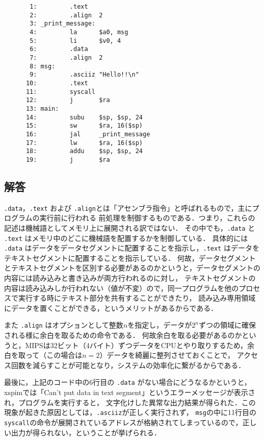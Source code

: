 \documentclass[a4j,11pt]{jarticle}
\begin{document}
\begin{verbatim}
       1:         .text
       2:         .align  2
       3: _print_message:
       4:         la      $a0, msg
       5:         li      $v0, 4
       6:         .data
       7:         .align  2
       8: msg:
       9:         .asciiz "Hello!!\n"
      10:         .text
      11:         syscall
      12:         j       $ra
      13: main:
      14:         subu    $sp, $sp, 24
      15:         sw      $ra, 16($sp)
      16:         jal     _print_message
      17:         lw      $ra, 16($sp)
      18:         addu    $sp, $sp, 24
      19:         j       $ra
\end{verbatim}

\subsection{解答}

{\tt.data}，{\tt.text} および {\tt.align}とは「アセンブラ指令」と呼ばれるもので，主にプログラムの実行前に行われる
前処理を制御するものである．つまり，これらの記述は機械語としてメモリ上に展開される訳ではない．
その中でも，{\tt.data} と {\tt.text} はメモリ中のどこに機械語を配置するかを制御している．
具体的には {\tt.data} はデータをデータセグメントに配置することを指示し，{\tt.text} はデータをテキストセグメントに配置することを指示している．
何故，データセグメントとテキストセグメントを区別する必要があるのかというと，データセグメントの内容には読み込みと書き込みが両方行われるのに対し，
テキストセグメントの内容は読み込みしか行われない（値が不変）ので，同一プログラムを他のプロセスで実行する時にテキスト部分を共有することができたり，
読み込み専用領域にデータを置くことができる，というメリットがあるからである．

また {\tt.align} はオプションとして整数$n$を指定し，データが$2^{n}$ずつの領域に確保される様に余白を取るための命令である．
何故余白を取る必要があるのかというと，MIPSは32ビット（4バイト）ずつデータをCPUとやり取りするため，余白を取って（この場合は$n = 2$）データを綺麗に整列させておくことで，
アクセス回数を減らすことが可能となり，システムの効率化に繋がるからである．

最後に，上記のコード中の6行目の {\tt.data} がない場合にどうなるかというと，xspimでは「Can't put data in text segment」というエラーメッセージが表示され，プログラムを実行すると，
文字化けした異常な出力結果が得られた．この現象が起きた原因としては，{{\tt .asciiz}}が正しく実行されず，
{{\tt msg}}の中に11行目の{{\tt syscall}}の命令が展開されているアドレスが格納されてしまっているので，正しい出力が得られない，ということが挙げられる． 
\end{document}
